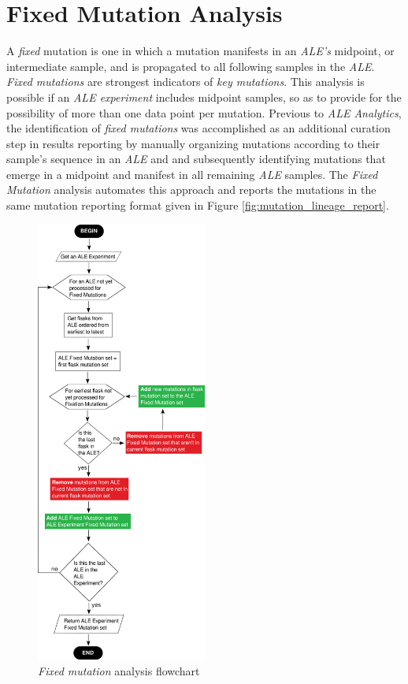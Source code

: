 \documentclass[12pt,final,masters,chapterheads]{ucsd}  %
\begin{document}
\section{Fixed Mutation Analysis}

A \textit{fixed} mutation is one in which a mutation manifests in an \textit{ALE's} midpoint, or intermediate sample, and is propagated to all following samples in the \textit{ALE}. \textit{Fixed mutations} are strongest indicators of \textit{key mutations}. This analysis is possible if an \textit{ALE experiment} includes midpoint samples, so as to provide for the possibility of more than one data point per mutation. Previous to \textit{ALE Analytics}, the identification of \textit{fixed mutations} was accomplished as an additional curation step in results reporting by manually organizing mutations according to their sample's sequence in an \textit{ALE} and and subsequently identifying mutations that emerge in a midpoint and manifest in all remaining \textit{ALE} samples. The \textit{Fixed Mutation} analysis automates this approach and reports the mutations in the same mutation reporting format given in Figure \ref{fig:mutation_lineage_report}.
\begin{figure}[H]
  \caption{\textit{Fixed mutation} analysis flowchart}
  \centering
  \includegraphics[width=0.50\textwidth]{fixed_mutation_flowchart.png}
\end{figure}
\end{document}
